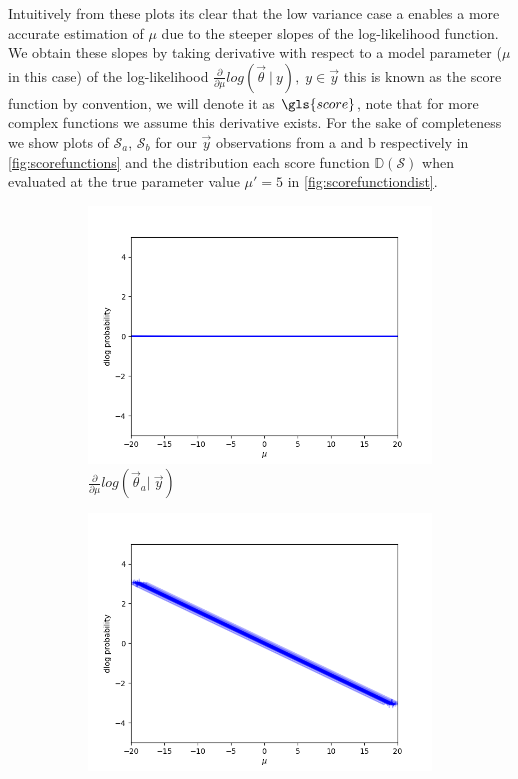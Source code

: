 \noindent Intuitively from these plots its clear that the low variance case a enables a more accurate estimation of $\mu$ due to the steeper slopes of the log-likelihood function. We obtain these slopes by taking derivative with respect to a model parameter ($\mu$ in this case) of the log-likelihood $\frac{\partial}{\partial\mu} log(\vec{\theta}\ |\ y),\;y\in\vec{y}$ this is known as the score function by convention, we will denote it as $\gls{score}$, note that for more complex functions we assume this derivative exists. For the sake of completeness we show plots of $\mathcal{S}_a$, $\mathcal{S}_b$ for our $\vec{y}$ observations from a and b respectively in \cref{fig:scorefunctions} and the distribution each score function $\mathbb{D}(\mathcal{S})$ when evaluated at the true parameter value $\mu' = 5$ in \cref{fig:scorefunctiondist}.
\begin{figure}
    \centering
    \begin{subfigure}{0.475\textwidth}
        \includegraphics[width=\textwidth]{figs/background/deriv_var_10.png}
        \caption[]{$\frac{\partial}{\partial\mu} log(\vec{\theta}_a |\ \vec{y})$}
    \end{subfigure}
    \begin{subfigure}{0.475\textwidth}
        \includegraphics[width=\textwidth]{figs/background/deriv_var_0.5.png}

\end{subfigure}
\end{figure}
